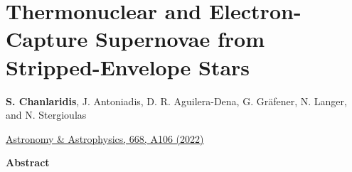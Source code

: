 \documentclass[main.tex]{subfiles}
\begin{document}
    \chapter[Thermonuclear and Electron-Capture Supernovae from Stripped-Envelope Stars]{Thermonuclear and Electron-Capture Supernovae from Stripped-Envelope Stars}
    \label{ch:tn_v_ec_sn}

    
    
    \begin{center}
        \textbf{S. Chanlaridis}, J. Antoniadis, D. R. Aguilera-Dena, G. Gr\"afener, N. Langer, and N. Stergioulas \\
        \begin{center}
            \href{https://www.aanda.org/articles/aa/full_html/2022/12/aa43035-22/aa43035-22.html}{Astronomy \& Astrophysics, 668, A106 (2022)}
        \end{center}
    \end{center}
        
        
    \begin{center}
        \textbf{\large Abstract}
    \end{center}
\end{document}
